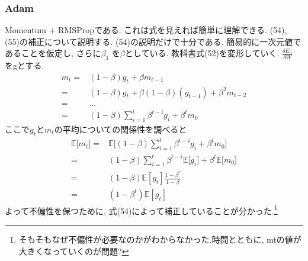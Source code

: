 \documentclass[a4paper,11pt]{jsarticle}
\begin{document}
\subsubsection*{Adam}
Momentum + RMSPropである. これは式を見えれば簡単に理解できる.
(54), (55)の補正について説明する.
(54)の説明だけで十分である. 簡易的に一次元値であることを仮定し, さらに$\beta_1$
を$\beta $としている. 教科書式(52)を変形していく.
$\frac{\delta E_n}{\delta W}$ をgとする.
\begin{align*}
  m_t = & (1 - \beta)g_t + \beta m_{t-1}                                \\
  =     & (1 - \beta)g_t + \beta (1 - \beta)(g_{t-1}) + \beta^2 m_{t-2} \\
  =     & \dots                                                         \\
  =     & (1 - \beta)\sum_{i=1}^{t}\beta^{t-i}g_i + \beta^{t}m_{0}
\end{align*}
ここで$g_t$と$m_t$の平均についての関係性を調べると
\begin{align*}
  \mathbb{E}\lbrack m_t \rbrack = & \mathbb{E}\lbrack (1 - \beta)\sum_{i=1}^{t}\beta^{t-i}g_i + \beta^{t}m_{0} \rbrack                     \\
  =                               & (1-\beta)\sum_{i=1}^{t}\beta^{t-i}\mathbb{E}\lbrack g_i \rbrack + \beta^t\mathbb{E}\lbrack m_0 \rbrack \\
  =                               & (1 - \beta)\mathbb{E}[g_t]\frac{1-\beta^t}{1-\beta}                                                    \\
  =                               & (1 - \beta^t)\mathbb{E}[g_t]
\end{align*}
よって不偏性を保つために, 式(54)によって補正していることが分かった.\footnote{そもそもなぜ不偏性が必要なのかがわからなかった.時間とともに, mtの値が大きくなっていくのが問題?}
\end{document}
